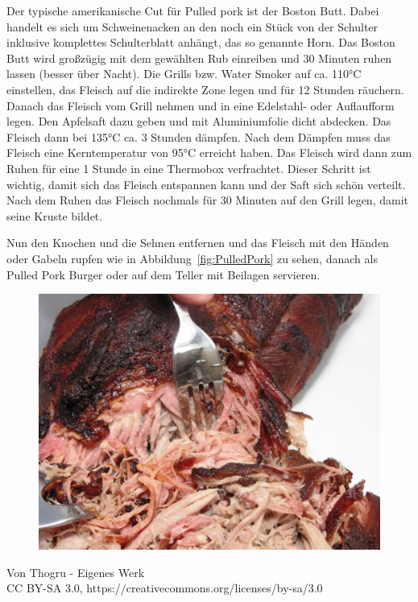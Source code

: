 Der typische amerikanische Cut für Pulled pork ist der Boston Butt. Dabei 
handelt es sich um Schweinenacken an den noch ein Stück von der 
Schulter  inklusive komplettes Schulterblatt anhängt, das so genannte 
Horn.
Das Boston Butt wird großzügig mit dem gewählten Rub einreiben und 30 
Minuten ruhen lassen (besser über Nacht). Die Grills bzw. Water Smoker 
auf ca. 110°C einstellen, das Fleisch auf die indirekte Zone legen und für 
12 Stunden räuchern. Danach das Fleisch vom Grill nehmen und in eine 
Edelstahl- oder Auflaufform legen. Den Apfelsaft dazu geben und mit 
Aluminiumfolie dicht abdecken. Das Fleisch dann bei 135°C ca. 3 Stunden 
dämpfen. Nach dem Dämpfen muss das Fleisch eine Kerntemperatur von 
95°C erreicht haben. Das Fleisch wird dann zum Ruhen für eine 1 Stunde 
in eine Thermobox verfrachtet. Dieser Schritt ist wichtig, damit sich das
Fleisch entspannen kann und der Saft sich schön verteilt. Nach dem 
Ruhen das Fleisch nochmals für 30 Minuten auf den Grill legen, damit 
seine Kruste bildet.

Nun den Knochen und die Sehnen entfernen und das Fleisch mit den 
Händen oder Gabeln rupfen wie in Abbildung~\vref{fig:PulledPork} zu 
sehen, danach als Pulled Pork Burger oder auf dem Teller mit Beilagen 
servieren.
\newpage
\begin{figure}[htbp]
		\centering
		\begin{minipage}{1\textwidth}
		\centering
		\includegraphics[width=1\linewidth]{pics/Pulled_Pork}
		\label{fig:PulledPork}
	\end{minipage}
\end{figure}
Von Thogru - Eigenes Werk\\
CC BY-SA 3.0, https://creativecommons.org/licenses/by-sa/3.0
\newpage

